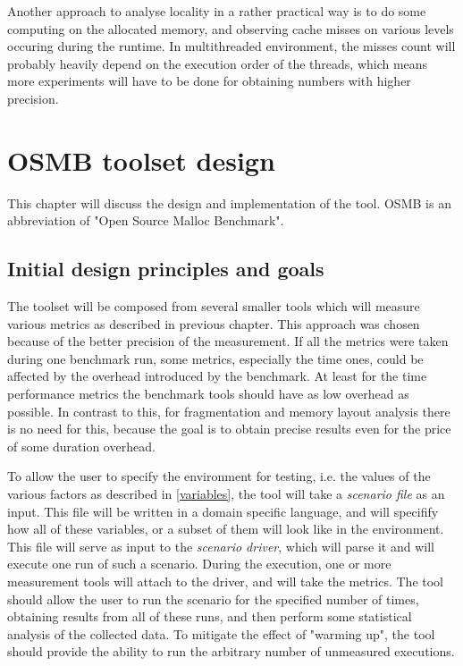 Another approach to analyse locality in a rather practical way is to do some
computing on the allocated memory, and observing cache misses on various levels
occuring during the runtime. In multithreaded environment, the misses count will
probably heavily depend on the execution order of the threads, which means more
experiments will have to be done for obtaining numbers with higher precision.

\chapter{OSMB toolset design}

This chapter will discuss the design and implementation of the tool. OSMB is an
abbreviation of "Open Source Malloc Benchmark".

\section{Initial design principles and goals}

The toolset will be composed from several smaller tools which will measure
various metrics as described in previous chapter. This approach was chosen
because of the better precision of the measurement. If all the metrics were taken
during one benchmark run, some metrics, especially the time ones, could be
affected by the overhead introduced by the benchmark. At least for the time
performance metrics the benchmark tools should have as low overhead as possible.
In contrast to this, for fragmentation and memory layout analysis there is no
need for this, because the goal is to obtain precise results even for the price
of some duration overhead.

To allow the user to specify the environment for testing, i.e. the values of the
various factors as described in \ref{variables}, the tool will take a {\em
scenario file} as an input. This file will be written in a domain specific
language, and will specifify how all of these variables, or a subset of them will
look like in the environment. This file will serve as input to the {\em scenario
driver}, which will parse it and will execute one run of such a scenario. During
the execution, one or more measurement tools will attach to the driver, and will
take the metrics. The tool should allow the user to run the scenario for the
specified number of times, obtaining results from all of these runs, and then
perform some statistical analysis of the collected data. To mitigate the effect
of "warming up", the tool should provide the ability to run the arbitrary number
of unmeasured executions.

